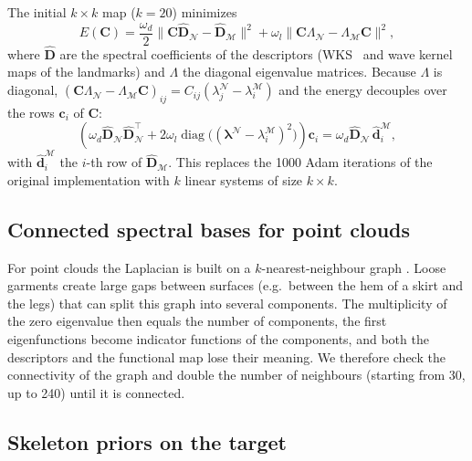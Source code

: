 \documentclass[11pt]{article}
\newcommand{\M}{\mathcal{M}}
\newcommand{\N}{\mathcal{N}}
\newcommand{\C}{\mathbf{C}}
\begin{document}
The initial $k \times k$ map ($k = 20$) minimizes
\begin{equation}
  E(\C) = \frac{\omega_d}{2} \|\C \widehat{\mathbf{D}}_\N - \widehat{\mathbf{D}}_\M\|^2
        + \omega_l \|\C \Lambda_\N - \Lambda_\M \C\|^2 ,
\end{equation}
where $\widehat{\mathbf{D}}$ are the spectral coefficients of the descriptors
(WKS~\citep{aubry2011wave} and wave kernel maps of the landmarks) and
$\Lambda$ the diagonal eigenvalue matrices. Because $\Lambda$ is diagonal,
$(\C\Lambda_\N - \Lambda_\M\C)_{ij} = C_{ij}(\lambda^\N_j - \lambda^\M_i)$ and
the energy decouples over the rows $\mathbf{c}_i$ of $\C$:
\begin{equation}
  \left(\omega_d \widehat{\mathbf{D}}_\N \widehat{\mathbf{D}}_\N^\top
        + 2\omega_l \operatorname{diag}\!\big((\bm{\lambda}^\N - \lambda^\M_i)^2\big)\right) \mathbf{c}_i
  = \omega_d \widehat{\mathbf{D}}_\N \, \widehat{\mathbf{d}}^{\M}_i ,
\end{equation}
with $\widehat{\mathbf{d}}^{\M}_i$ the $i$-th row of $\widehat{\mathbf{D}}_\M$.
This replaces the 1000 Adam iterations of the original implementation with $k$
linear systems of size $k \times k$.

\subsection{Connected spectral bases for point clouds}
\label{sec:connectivity}

For point clouds the Laplacian is built on a $k$-nearest-neighbour graph
\citep{sharp2020laplacian}. Loose garments create large gaps between surfaces
(e.g.\ between the hem of a skirt and the legs) that can split this graph into
several components. The multiplicity of the zero eigenvalue then equals the
number of components, the first eigenfunctions become indicator functions of
the components, and both the descriptors and the functional map lose their
meaning. We therefore check the connectivity of the graph and double the
number of neighbours (starting from 30, up to 240) until it is connected.

\subsection{Skeleton priors on the target}
\label{sec:priors}
\end{document}
